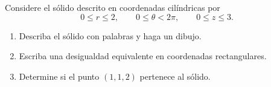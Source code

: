 Considere el sólido descrito en coordenadas cilíndricas por
\[
0\leq r\leq 2,\qquad 0\leq\theta<2\pi,\qquad 0\leq z\leq 3.
\]
\begin{enumerate}
    \item Describa el sólido con palabras y haga un dibujo.
    \item Escriba una desigualdad equivalente en coordenadas rectangulares.
    \item Determine si el punto $(1,1,2)$ pertenece al sólido.
\end{enumerate}
